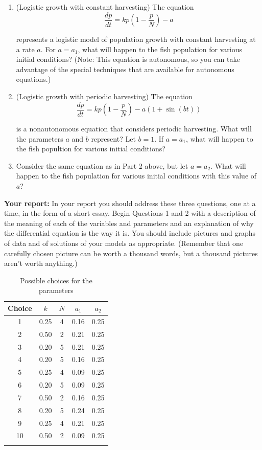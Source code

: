 \documentclass
[justified,nohyper]
{tufte-handout}
\begin{document}
\begin{enumerate}
	\item (Logistic growth with constant harvesting) The equation
	\[
		\displaystyle\frac{dp}{dt}=kp\left(1-\displaystyle\frac{p}{N}\right) - a
	\]
	
	represents a logistic model of population growth with constant harvesting at a rate $a$. For $a=a_1$, what will happen to the fish population for various initial conditions? (Note: This equation is autonomous, so you can take advantage of the special techniques that are available for autonomous equations.)
	
	\item (Logistic growth with periodic harvesting) The equation
	\[
		\displaystyle\frac{dp}{dt}= kp\left(1-\displaystyle\frac{p}{N}\right) - a\left(1+\sin(bt)\right)
	\]
	
	is a nonautonomous equation that considers periodic harvesting. What will the parameters $a$ and $b$ represent? Let $b=1$. If $a=a_1$, what will happen to the fish popultion for various initial conditions?
	
	\item Consider the same equation as in Part 2 above, but let $a=a_2$. What will happen to the fish population for various initial conditions with this value of $a$?	
	
\end{enumerate}

\textbf{Your report:} In your report you should address these three questions, one at a time, in the form of a short essay. Begin Questions 1 and 2 with a description of the meaning of each of the variables and parameters and an explanation of why the differential equation is the way it is. You should include pictures and graphs of data and of solutions of your models as appropriate. (Remember that one carefully chosen picture can be worth a thousand words, but a thousand pictures aren't worth anything.)

\begin{fullwidth}
\begin{table}
\begin{tabular}{ccccc}
\toprule
Choice & $k$ & $N$ & $a_1$ & $a_2$ \\
\midrule
1 & 0.25 & 4 & 0.16 & 0.25 \\
2 & 0.50 & 2 & 0.21 & 0.25 \\
3 & 0.20 & 5 & 0.21 & 0.25 \\
4 & 0.20 & 5 & 0.16 & 0.25 \\
5 & 0.25 & 4 & 0.09 & 0.25 \\
6 & 0.20 & 5 & 0.09 & 0.25 \\
7 & 0.50 & 2 & 0.16 & 0.25 \\
8 & 0.20 & 5 & 0.24 & 0.25 \\
9 & 0.25 & 4 & 0.21 & 0.25 \\
10 & 0.50 & 2 & 0.09 & 0.25 \\
\bottomrule
\caption{\label{param1} Possible choices for the parameters}
\end{tabular}
\end{table}
\end{fullwidth}
\end{document}
